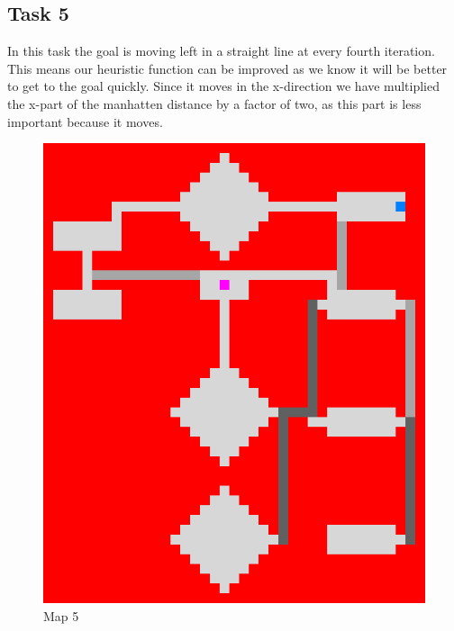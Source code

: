 \documentclass{article}
\begin{document}
\subsection{Task 5}
In this task the goal is moving left in a straight line at every fourth iteration. This means our heuristic function can be improved as we know it will be better to get to the goal quickly. Since it moves in the x-direction we have multiplied the x-part of the manhatten distance by a factor of two, as this  part is less important because it moves.
\begin{figure}[h]
	\centering
	\begin{minipage}{0.4\textwidth}
		\includegraphics[width=\textwidth]{images/map5}
    		\caption{Map 5}
	\end{minipage}
	\hfill
	\begin{minipage}{0.4\textwidth}

\end{minipage}
\end{figure}
\end{document}
